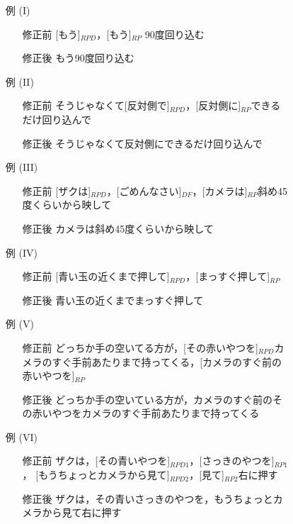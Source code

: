 \begin{figure}
\footnotesize
 \begin{enumerate}

\item[例] (I)
  \begin{enumerate}
  \item[修正前 ] [もう]$_{RPD}$，[もう]$_{RP}$ 90度回り込む
  \item[修正後 ] もう90度回り込む
  \end{enumerate}

\item[例] (II)
  \begin{enumerate}
  \item[修正前 ]  そうじゃなくて[反対側で]$_{RPD}$，[反対側に]$_{RP}$できるだけ回り込んで
  \item[修正後 ]  そうじゃなくて反対側にできるだけ回り込んで
  \end{enumerate}


\item[例] (III)
  \begin{enumerate}
  \item[修正前 ] [ザクは]$_{RPD}$，[ごめんなさい]$_{DF}$，[カメラは]$_{RP}$斜め45度くらいから映して
  \item[修正後 ] カメラは斜め45度くらいから映して
  \end{enumerate}

\item[例] (IV)
  \begin{enumerate}
  \item[修正前 ]  [青い玉の近くまで押して]$_{RPD}$，[まっすぐ押して]$_{RP}$
  \item[修正後 ]  青い玉の近くまでまっすぐ押して
  \end{enumerate}

\item[例] (V)
  \begin{enumerate}
  \item[修正前 ] どっちか手の空いてる方が，[その赤いやつを]$_{RPD}$カメラのすぐ手前あたりまで持ってくる，[カメラのすぐ前の赤いやつを]$_{RP}$
  \item[修正後 ]  どっちか手の空いている方が，カメラのすぐ前のその赤いやつをカメラのすぐ手前あたりまで持ってくる
  \end{enumerate}

\item[例] (VI)
  \begin{enumerate}
  \item[修正前 ] ザクは，[その青いやつを]$_{RPD1}$，[さっきのやつを]$_{RP1}$，
  [もうちょっとカメラから見て]$_{RPD2}$，[見て]$_{RP2}$右に押す 
  \item[修正後 ] ザクは，その青いさっきのやつを，もうちょっとカメラから見て右に押す
  \end{enumerate}


\end{enumerate}
\end{figure}
